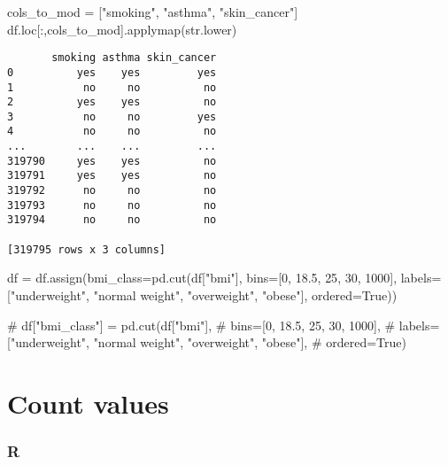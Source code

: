 \documentclass[
  letterpaper,
  DIV=11,
  numbers=noendperiod]{scrreprt}
\newenvironment{Shaded}{\begin{snugshade}}{\end{snugshade}}
\newcommand{\BuiltInTok}[1]{\textcolor[rgb]{0.00,0.46,0.62}{#1}}
\newcommand{\CommentTok}[1]{\textcolor[rgb]{0.37,0.37,0.37}{#1}}
\newcommand{\DecValTok}[1]{\textcolor[rgb]{0.68,0.00,0.00}{#1}}
\newcommand{\FloatTok}[1]{\textcolor[rgb]{0.68,0.00,0.00}{#1}}
\newcommand{\NormalTok}[1]{\textcolor[rgb]{0.00,0.46,0.62}{#1}}
\newcommand{\OperatorTok}[1]{\textcolor[rgb]{0.37,0.37,0.37}{#1}}
\newcommand{\StringTok}[1]{\textcolor[rgb]{0.13,0.47,0.30}{#1}}
\newcommand{\VariableTok}[1]{\textcolor[rgb]{0.07,0.07,0.07}{#1}}
\begin{document}
\begin{Shaded}
\begin{Highlighting}[]
\NormalTok{cols\_to\_mod }\OperatorTok{=}\NormalTok{ [}\StringTok{"smoking"}\NormalTok{, }\StringTok{"asthma"}\NormalTok{, }\StringTok{"skin\_cancer"}\NormalTok{]}
\NormalTok{df.loc[:,cols\_to\_mod].applymap(}\BuiltInTok{str}\NormalTok{.lower)}
\end{Highlighting}
\end{Shaded}

\begin{verbatim}
       smoking asthma skin_cancer
0          yes    yes         yes
1           no     no          no
2          yes    yes          no
3           no     no         yes
4           no     no          no
...        ...    ...         ...
319790     yes    yes          no
319791     yes    yes          no
319792      no     no          no
319793      no     no          no
319794      no     no          no

[319795 rows x 3 columns]
\end{verbatim}

\begin{Shaded}
\begin{Highlighting}[]
\NormalTok{df }\OperatorTok{=}\NormalTok{ df.assign(bmi\_class}\OperatorTok{=}\NormalTok{pd.cut(df[}\StringTok{"bmi"}\NormalTok{], }
\NormalTok{    bins}\OperatorTok{=}\NormalTok{[}\DecValTok{0}\NormalTok{, }\FloatTok{18.5}\NormalTok{, }\DecValTok{25}\NormalTok{, }\DecValTok{30}\NormalTok{, }\DecValTok{1000}\NormalTok{], }
\NormalTok{    labels}\OperatorTok{=}\NormalTok{[}\StringTok{"underweight"}\NormalTok{, }\StringTok{"normal weight"}\NormalTok{, }\StringTok{"overweight"}\NormalTok{, }\StringTok{"obese"}\NormalTok{],}
\NormalTok{    ordered}\OperatorTok{=}\VariableTok{True}\NormalTok{))}

\CommentTok{\# df["bmi\_class"] = pd.cut(df["bmi"], }
\CommentTok{\#     bins=[0, 18.5, 25, 30, 1000], }
\CommentTok{\#     labels=["underweight", "normal weight", "overweight", "obese"],}
\CommentTok{\#     ordered=True)}
\end{Highlighting}
\end{Shaded}

\hypertarget{count-values}{%
\section{Count values}\label{count-values}}

\hypertarget{r-26}{%
\subsubsection{R}\label{r-26}}
\end{document}
